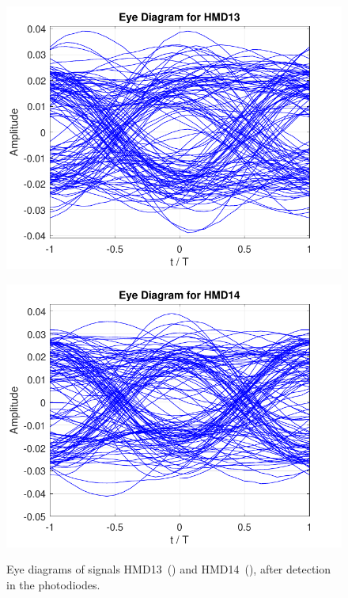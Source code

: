 \begin{figure}[H]
	\centering
	\begin{minipage}{0.45\textwidth}
		\centering
		\includegraphics[width=1\textwidth]		
		{./sdf/m_qam_system/figures/simulations/03_eNoise/HMD13_ed.pdf}
		\subcaption{}\label{fig:sim_eNoiseHmd13ed}
	\end{minipage}
	\begin{minipage}{0.45\textwidth}
		\centering
		\includegraphics[width=1\textwidth]
		{sdf/m_qam_system/figures/simulations/03_eNoise/HMD14_ed.pdf}
		\subcaption{}\label{fig:sim_eNoiseHmd14ed}
	\end{minipage}
	\caption{Eye diagrams of signals HMD13~() and 
		HMD14~(), after detection in the 
		photodiodes.}\label{fig:sim_eNoiseHmd1314ed}
\end{figure}

